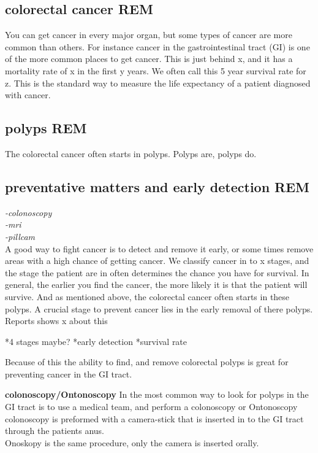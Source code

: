   \subsection{colorectal cancer REM}
    You can get cancer in every major organ, but some types of cancer are more common than others.	
    For instance cancer in the gastrointestinal tract (GI) is one of the more common places 
    to get cancer. This is just behind x, and it has a mortality rate of x in the first y years. %
    We often call this 5 year survival rate for z. This is the standard way to measure the life expectancy of a patient diagnosed with cancer. 
	
    \vspace{10px}

  \subsection{polyps REM}
    The colorectal cancer often starts in polyps. 
    Polyps are, polyps do.\\
	
    \vspace{10px}
	
  \subsection{preventative matters and early detection REM}
    \textit{-colonoscopy\\ 
		-mri\\
		-pillcam\\}
    A good way to fight cancer is to detect and remove it early, or some times remove areas with a high chance of getting cancer.
    We classify cancer in to x stages, and the stage the patient are in often determines the chance you have for survival. 
    In general, the earlier you find the cancer, the more likely it is that the patient will survive. 
    And as mentioned above, the colorectal cancer often starts in these polyps. A crucial stage to prevent cancer lies in the 
    early removal of there polyps.
    Reports shows x about this %
	
    *4 stages maybe?
    *early detection
    *survival rate
	
		
    Because of this the ability to find, and remove colorectal polyps is great for preventing cancer in the GI tract. 
	
	
    \vspace{10px}
	\textbf{colonoscopy/Ontonoscopy}
	In the most common way to look for polyps in the GI tract is to use a medical team, and perform a colonoscopy or Ontonoscopy
	colonoscopy is preformed with a camera-stick that is inserted in to the GI tract through the patients anus.\\
	Onoskopy is the same procedure, only the camera is inserted orally. \\
	
